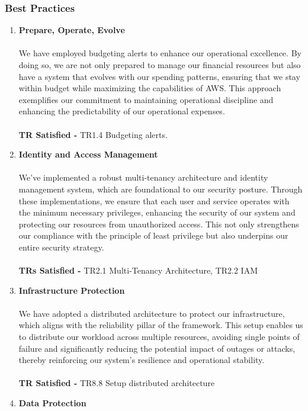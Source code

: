 \documentclass{article}
\begin{document}
\subsubsection{Best Practices}
\begin{enumerate}
    \item \textbf{Prepare, Operate, Evolve}  \cite{prepare}\cite{operate}\cite{evolve}\\\\
    We have employed budgeting alerts to enhance our operational excellence. By doing so, we are not only prepared to manage our financial resources but also have a system that evolves with our spending patterns, ensuring that we stay within budget while maximizing the capabilities of AWS. This approach exemplifies our commitment to maintaining operational discipline and enhancing the predictability of our operational expenses.\\\\
    \textbf{TR Satisfied -} TR1.4 Budgeting alerts.
    \item \textbf{Identity and Access Management} \\\\
    We've implemented a robust multi-tenancy architecture and identity management system, which are foundational to our security posture. Through these implementations, we ensure that each user and service operates with the minimum necessary privileges, enhancing the security of our system and protecting our resources from unauthorized access. This not only strengthens our compliance with the principle of least privilege but also underpins our entire security strategy.\\\\ 
    \textbf{TRs Satisfied -} TR2.1 Multi-Tenancy Architecture, TR2.2 IAM
    \item \textbf{Infrastructure Protection}\cite{Infrastructure protection} \\\\
    We have adopted a distributed architecture to protect our infrastructure, which aligns with the reliability pillar of the framework. This setup enables us to distribute our workload across multiple resources, avoiding single points of failure and significantly reducing the potential impact of outages or attacks, thereby reinforcing our system's resilience and operational stability.\\\\
    \textbf{TR Satisfied -} TR8.8 Setup distributed architecture
    \item \textbf{Data Protection}\cite{Data protection} \\\\

\end{enumerate}
\end{document}
